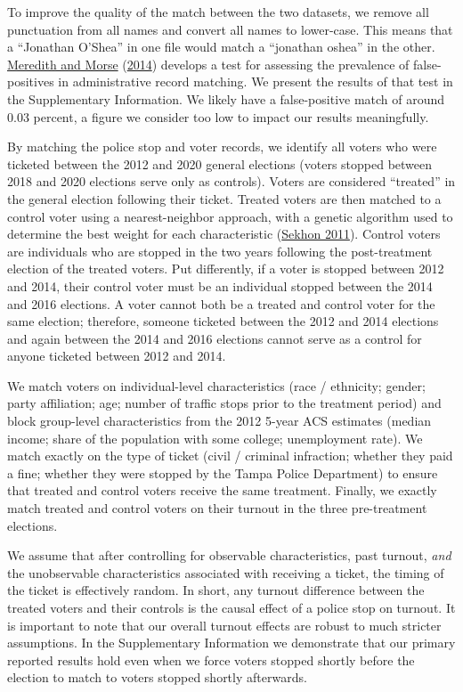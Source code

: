 \documentclass[
  12pt,
]{article}
\begin{document}
To improve the quality of the match between the two datasets, we remove all punctuation from all names and convert all names to lower-case. This means that a ``Jonathan O'Shea'' in one file would match a ``jonathan oshea'' in the other. \protect\hyperlink{ref-Meredith2014}{Meredith and Morse} (\protect\hyperlink{ref-Meredith2014}{2014}) develops a test for assessing the prevalence of false-positives in administrative record matching. We present the results of that test in the Supplementary Information. We likely have a false-positive match of around 0.03 percent, a figure we consider too low to impact our results meaningfully.

By matching the police stop and voter records, we identify all voters who were ticketed between the 2012 and 2020 general elections (voters stopped between 2018 and 2020 elections serve only as controls). Voters are considered ``treated'' in the general election following their ticket. Treated voters are then matched to a control voter using a nearest-neighbor approach, with a genetic algorithm used to determine the best weight for each characteristic (\protect\hyperlink{ref-Sekhon2011}{Sekhon 2011}). Control voters are individuals who are stopped in the two years following the post-treatment election of the treated voters. Put differently, if a voter is stopped between 2012 and 2014, their control voter must be an individual stopped between the 2014 and 2016 elections. A voter cannot both be a treated and control voter for the same election; therefore, someone ticketed between the 2012 and 2014 elections and again between the 2014 and 2016 elections cannot serve as a control for anyone ticketed between 2012 and 2014.

We match voters on individual-level characteristics (race / ethnicity; gender; party affiliation; age; number of traffic stops prior to the treatment period) and block group-level characteristics from the 2012 5-year ACS estimates (median income; share of the population with some college; unemployment rate). We match exactly on the type of ticket (civil / criminal infraction; whether they paid a fine; whether they were stopped by the Tampa Police Department) to ensure that treated and control voters receive the same treatment. Finally, we exactly match treated and control voters on their turnout in the three pre-treatment elections.

We assume that after controlling for observable characteristics, past turnout, \emph{and} the unobservable characteristics associated with receiving a ticket, the timing of the ticket is effectively random. In short, any turnout difference between the treated voters and their controls is the causal effect of a police stop on turnout. It is important to note that our overall turnout effects are robust to much stricter assumptions. In the Supplementary Information we demonstrate that our primary reported results hold even when we force voters stopped shortly before the election to match to voters stopped shortly afterwards.
\end{document}
